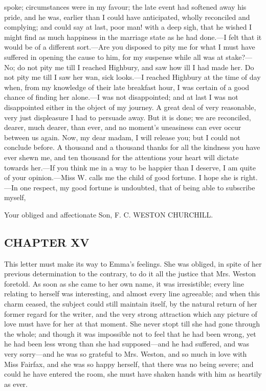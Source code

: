 spoke; circumstances were in my favour; the late event had softened away his pride, and he was, earlier than I could have anticipated, wholly reconciled and complying; and could say at last, poor man! with a deep sigh, that he wished I might find as much happiness in the marriage state as he had done.---I felt that it would be of a different sort.---Are you disposed to pity me for what I must have suffered in opening the cause to him, for my suspense while all was at stake?---No; do not pity me till I reached Highbury, and saw how ill I had made her. Do not pity me till I saw her wan, sick looks.---I reached Highbury at the time of day when, from my knowledge of their late breakfast hour, I was certain of a good chance of finding her alone.---I was not disappointed; and at last I was not disappointed either in the object of my journey. A great deal of very reasonable, very just displeasure I had to persuade away. But it is done; we are reconciled, dearer, much dearer, than ever, and no moment's uneasiness can ever occur between us again. Now, my dear madam, I will release you; but I could not conclude before. A thousand and a thousand thanks for all the kindness you have ever shewn me, and ten thousand for the attentions your heart will dictate towards her.---If you think me in a way to be happier than I deserve, I am quite of your opinion.---Miss W. calls me the child of good fortune. I hope she is right.---In one respect, my good fortune is undoubted, that of being able to subscribe myself,

Your obliged and affectionate Son,\crlf
\crlf
F. C. WESTON CHURCHILL.

\subsection[chapter-xv-2]{\useURL[url53][][][]\from[url53]CHAPTER XV}

This letter must make its way to Emma's feelings. She was obliged, in spite of her previous determination to the contrary, to do it all the justice that Mrs. Weston foretold. As soon as she came to her own name, it was irresistible; every line relating to herself was interesting, and almost every line agreeable; and when this charm ceased, the subject could still maintain itself, by the natural return of her former regard for the writer, and the very strong attraction which any picture of love must have for her at that moment. She never stopt till she had gone through the whole; and though it was impossible not to feel that he had been wrong, yet he had been less wrong than she had supposed---and he had suffered, and was very sorry---and he was so grateful to Mrs. Weston, and so much in love with Miss Fairfax, and she was so happy herself, that there was no being severe; and could he have entered the room, she must have shaken hands with him as heartily as ever.

